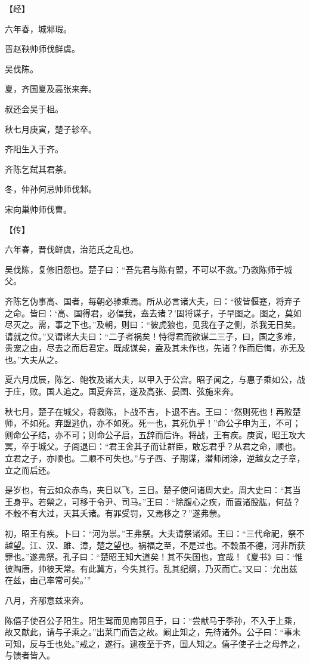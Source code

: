 \documentclass[a4paper,12pt,UTF8,twoside]{ctexbook}
\begin{document}
【经】

六年春，城邾瑕。

晋赵鞅帅师伐鲜虞。

吴伐陈。

夏，齐国夏及高张来奔。

叔还会吴于柤。

秋七月庚寅，楚子轸卒。

齐阳生入于齐。

齐陈乞弑其君荼。

冬，仲孙何忌帅师伐邾。

宋向巢帅师伐曹。

【传】

六年春，晋伐鲜虞，治范氏之乱也。

吴伐陈，复修旧怨也。楚子曰：“吾先君与陈有盟，不可以不救。”乃救陈师于城父。

齐陈乞伪事高、国者，每朝必骖乘焉。所从必言诸大夫，曰：“彼皆偃蹇，将弃子之命。皆曰：‘高、国得君，必偪我，盍去诸？’固将谋子，子早图之。图之，莫如尽灭之。需，事之下也。”及朝，则曰：“彼虎狼也，见我在子之侧，杀我无日矣。请就之位。”又谓诸大夫曰：“二子者祸矣！恃得君而欲谋二三子，曰，国之多难，贵宠之由，尽去之而后君定。既成谋矣，盍及其未作也，先诸？作而后悔，亦无及也。”大夫从之。

夏六月戊辰，陈乞、鲍牧及诸大夫，以甲入于公宫。昭子闻之，与惠子乘如公，战于庄，败。国人追之。国夏奔莒，遂及高张、晏圉、弦施来奔。

秋七月，楚子在城父，将救陈，卜战不吉，卜退不吉。王曰：“然则死也！再败楚师，不如死。弃盟逃仇，亦不如死。死一也，其死仇乎！”命公子申为王，不可；则命公子结，亦不可；则命公子启，五辞而后许。将战，王有疾。庚寅，昭王攻大冥，卒于城父。子闾退曰：“君王舍其子而让群臣，敢忘君乎？从君之命，顺也。立君之子，亦顺也。二顺不可失也。”与子西、子期谋，潜师闭涂，逆越女之子章，立之而后还。

是岁也，有云如众赤鸟，夹日以飞，三日。楚子使问诸周大史。周大史曰：“其当王身乎。若禜之，可移于令尹、司马。”王曰：“除腹心之疾，而置诸股肱，何益？不穀不有大过，天其夭诸。有罪受罚，又焉移之？”遂弗禜。

初，昭王有疾。卜曰：“河为祟。”王弗祭。大夫请祭诸郊。王曰：“三代命祀，祭不越望。江、汉、雎、漳，楚之望也。祸福之至，不是过也。不穀虽不德，河非所获罪也。”遂弗祭。孔子曰：“楚昭王知大道矣！其不失国也，宜哉！《夏书》曰：‘惟彼陶唐，帅彼天常。有此冀方，今失其行。乱其纪纲，乃灭而亡。’又曰：‘允出兹在兹，由己率常可矣。’”

八月，齐邴意兹来奔。

陈僖子使召公子阳生。阳生驾而见南郭且于，曰：“尝献马于季孙，不入于上乘，故又献此，请与子乘之。”出莱门而告之故。阚止知之，先待诸外。公子曰：“事未可知，反与壬也处。”戒之，遂行。逮夜至于齐，国人知之。僖子使子士之母养之，与馈者皆入。
\end{document}
